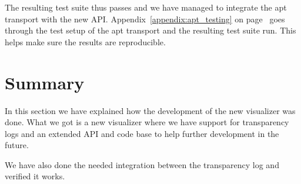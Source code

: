 \documentclass[../Main/thesis.tex]{subfiles}
\begin{document}
The resulting test suite thus passes and we have managed to integrate the apt
transport with the new API. Appendix~\ref{appendix:apt_testing} on
page~\pageref{appendix:apt_testing} goes through the test setup of the apt
transport and the resulting test suite run. This helps make sure the results are
reproducible.

\section*{Summary}\label{sec:development-summary}
In this section we have explained how the development of the new visualizer was
done. What we got is a new visualizer where we have support for transparency
logs and an extended API and code base to help further development in the
future.

We have also done the needed integration between the transparency log and
verified it works.

\blankpage
\end{document}

